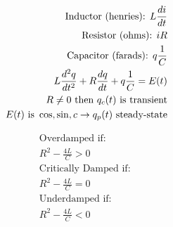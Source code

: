 \documentclass[12pt]{article}
\begin{document}
\vspace{45pt}

\hline

\newpage

\begin{multicols}{2}

  \begin{equation}
    \begin{split}
      \text{Inductor (\text{henries}): } L\frac{di}{dt}\\
      \text{Resistor (\text{ohms}): } iR\\
      \text{Capacitor (\text{farads}): } q\frac{1}{C}\\
      L\frac{d^2q}{dt^2}+R\frac{dq}{dt}+q\frac{1}{C}=E(t)\\
      R\neq0\text{ then } q_c(t) \text{ is transient}\\
      E(t)\text{ is } \cos, \sin, c\rightarrow q_p(t) \text{ steady-state}
    \end{split}
    \label{11}
  \end{equation}

  \begin{equation}
    \begin{split}
      \text{Overdamped if: }\\
      R^2-\frac{4L}{C}>0\\
      \text{Critically Damped if: }\\
      R^2-\frac{4L}{C}=0\\
      \text{Underdamped if: }\\
      R^2-\frac{4L}{C}<0\\
    \end{split}
    \label{12}
  \end{equation}

\end{multicols}
\end{document}
